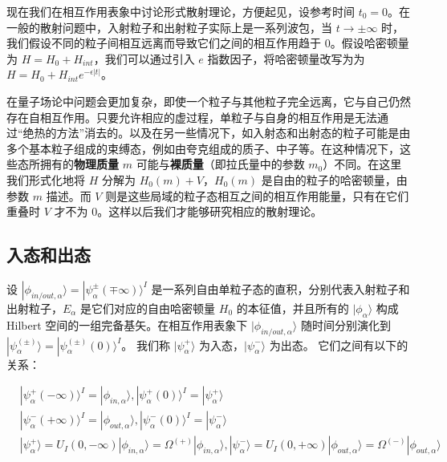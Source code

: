 
现在我们在相互作用表象中讨论形式散射理论，方便起见，设参考时间 $t_0=0$。在一般的散射问题中，入射粒子和出射粒子实际上是一系列波包，当 $t\rightarrow \pm\infty$ 时，我们假设不同的粒子间相互远离而导致它们之间的相互作用趋于 $0$。假设哈密顿量为 $H=H_0+H_{int}$，我们可以通过引入 $e$ 指数因子，将哈密顿量改写为为 $H=H_0+H_{int} e^{-\epsilon|t|}$。

在量子场论中问题会更加复杂，即使一个粒子与其他粒子完全远离，它与自己仍然存在自相互作用。只要允许相应的虚过程，单粒子与自身的相互作用是无法通过“绝热的方法”消去的。以及在另一些情况下，如入射态和出射态的粒子可能是由多个基本粒子组成的束缚态，例如由夸克组成的质子、中子等。在这种情况下，这些态所拥有的\textbf{物理质量} $m$ 可能与\textbf{裸质量}（即拉氏量中的参数 $m_0$）不同。在这里我们形式化地将 $H$ 分解为 $H_0(m)+V$，$H_0(m)$ 是自由的粒子的哈密顿量，由参数 $m$ 描述。而 $V$ 则是这些局域的粒子态相互之间的相互作用能量，只有在它们重叠时 $V$ 才不为 $0$。这样以后我们才能够研究相应的散射理论。

\subsection{入态和出态}
设 $|\phi_{in/out,\alpha}\rangle=|\psi_\alpha^{\pm}(\mp \infty)\rangle^I$ 是一系列自由单粒子态的直积，分别代表入射粒子和出射粒子，$E_\alpha$ 是它们对应的自由哈密顿量 $H_0$ 的本征值，并且所有的 $|\phi_\alpha\rangle$ 构成 Hilbert 空间的一组完备基矢。在相互作用表象下 $|\phi_{in/out,\alpha}\rangle$ 随时间分别演化到  $|\psi_\alpha^{(\pm)}\rangle=|\psi_\alpha^{(\pm)}(0)\rangle^I$。
我们称 $|\psi_\alpha^{+}\rangle$ 为入态，$|\psi_\alpha^{-}\rangle$ 为出态。 它们之间有以下的关系：

\begin{equation}
\begin{aligned}
&|\psi_\alpha^{+}(-\infty)\rangle^I=|\phi_{in,\alpha}\rangle,|\psi_\alpha^{+}(0)\rangle^I=|\psi_\alpha^{+}\rangle\\
&|\psi_\alpha^{-}(+\infty)\rangle^I=|\phi_{out,\alpha}\rangle,|\psi_\alpha^{-}(0)\rangle^I=|\psi_\alpha^{-}\rangle\\
&|\psi_\alpha^+\rangle=U_I(0,-\infty)|\phi_{in,\alpha}\rangle = \Omega^{(+)} |\phi_{in,\alpha}\rangle,
|\psi_\alpha^-\rangle=U_I(0,+\infty)|\phi_{out,\alpha} \rangle = \Omega^{(-)} |\phi_{out,\alpha}\rangle
\end{aligned}
\end{equation}

